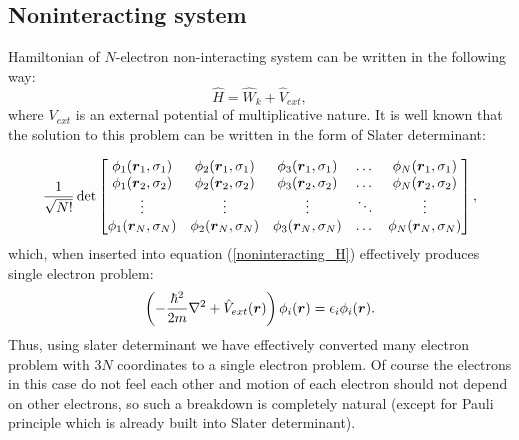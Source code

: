 \documentclass[openany, longbibliography,slovene,a4paper,12pt]{article}
\def\vec#1{\mbox{\boldmath$#1$}}
\begin{document}
\subsection{Noninteracting system}
Hamiltonian of $N$-electron non-interacting system can be written in the
following way:
 \begin{equation} \label{noninteracting_H}
   \hat H =\hat  W_k + \hat V_{ext}, 
 \end{equation}
 where $V_{ext}$ is an external potential of multiplicative nature. It is well
 known that the solution to this problem can be written in the form of Slater determinant:

 \[
      \frac{1}{\sqrt{N!}}\det 
   \begin{bmatrix}
   \phi_{1}(\vec r_1, \sigma_1) & \phi_{2}(\vec r_1, \sigma_1) & \phi_{3}(\vec
   r_1, \sigma_1) & \dots & \phi_{N}(\vec r_1, \sigma_1) \\
    \phi_{1}(\vec r_2, \sigma_2) & \phi_{2}(\vec r_2, \sigma_2) & \phi_{3}(\vec
    r_2, \sigma_2) & \dots & \phi_{N}(\vec r_2, \sigma_2) \\
    \vdots & \vdots & \vdots & \ddots & \vdots \\
     \phi_{1}(\vec r_N, \sigma_N) & \phi_{2}(\vec r_N, \sigma_N) & \phi_{3}(\vec r_N, \sigma_N) & \dots & \phi_{N}(\vec r_N, \sigma_N) \\
\end{bmatrix},
\]
 which, when inserted into equation (\ref{noninteracting_H}) effectively produces
 single electron problem:
 \begin{equation}
   \left(-\frac{\hbar^2}{2m}\nabla^2 + \hat V_{ext}(\vec r)\right) \phi_i (\vec r) = \epsilon_i \phi_i(\vec r).
 \end{equation}
 Thus, using slater determinant we have effectively converted many electron
 problem with $3N$ coordinates to a single electron problem. Of course the
 electrons in this case do not feel each other and motion of each electron
 should not depend on other electrons, so such a breakdown is completely natural
 (except for Pauli principle which is already built into Slater determinant).
 
\end{document}
